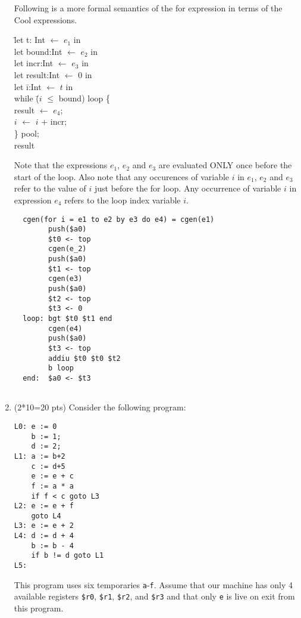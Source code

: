 \documentclass[10pt]{article}
\begin{document}
\begin{enumerate}
Following is a more formal semantics of the for expression in terms of the Cool
expressions.
\begin{tabbing}
  \hspace*{3mm} \= let t: Int $\leftarrow$ $e_1$ in \\
  \> let bound:Int  $\leftarrow$ $e_2$ in \\
  \> let incr:Int  $\leftarrow$ $e_3$ in \\
  \> let result:Int  $\leftarrow$ $0$ in \\
  \> let \= i:Int $\leftarrow$ $t$ in   \\
   \>  \> while \= ($i$ $\leq$ bound) loop \{ \\
     \>\>\>   result $\leftarrow$ $e_4$; \\
\> \> \> $i$ $\leftarrow$ $i$ + incr; \\
     \> \> \} pool; \\
     \> \> result  \\
\end{tabbing}

Note that the expressions $e_1$, $e_2$ and $e_3$ are evaluated ONLY once before the start of the loop.
Also note that any occurences of variable $i$ in $e_1$, $e_2$ and
$e_3$ refer to the value of $i$
just before the for loop.
Any occurrence of variable $i$ in expression $e_4$ refers to the loop index variable $i$.



\begin{verbatim}
  cgen(for i = e1 to e2 by e3 do e4) = cgen(e1)
        push($a0)
        $t0 <- top
        cgen(e_2)
        push($a0)
        $t1 <- top
        cgen(e3)
        push($a0)
        $t2 <- top
        $t3 <- 0
  loop: bgt $t0 $t1 end
        cgen(e4)
        push($a0)
        $t3 <- top
        addiu $t0 $t0 $t2
        b loop
  end:  $a0 <- $t3
      
  \end{verbatim}


\item (2*10=20 pts) Consider the following program:

\begin{verbatim}
L0: e := 0
    b := 1;
    d := 2;
L1: a := b+2
    c := d+5
    e := e + c
    f := a * a
    if f < c goto L3
L2: e := e + f
    goto L4
L3: e := e + 2
L4: d := d + 4
    b := b - 4
    if b != d goto L1
L5:
\end{verbatim}

This program uses six temporaries \texttt{a}-\texttt{f}.  Assume that
our machine has only 4 available registers \texttt{\$r0},
\texttt{\$r1}, \texttt{\$r2}, and \texttt{\$r3}
and that only
\texttt{e} is live on exit from this program.


\end{enumerate}
\end{document}
